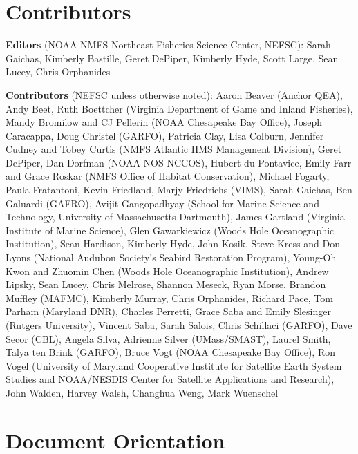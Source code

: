 \documentclass[
  10pt,
]{article}
\begin{document}
\hypertarget{contributors}{%
\section{Contributors}\label{contributors}}

\textbf{Editors} (NOAA NMFS Northeast Fisheries Science Center, NEFSC):
Sarah Gaichas, Kimberly Bastille, Geret DePiper, Kimberly Hyde, Scott
Large, Sean Lucey, Chris Orphanides

\textbf{Contributors} (NEFSC unless otherwise noted): Aaron Beaver
(Anchor QEA), Andy Beet, Ruth Boettcher (Virginia Department of Game and
Inland Fisheries), Mandy Bromilow and CJ Pellerin (NOAA Chesapeake Bay
Office), Joseph Caracappa, Doug Christel (GARFO), Patricia Clay, Lisa
Colburn, Jennifer Cudney and Tobey Curtis (NMFS Atlantic HMS Management
Division), Geret DePiper, Dan Dorfman (NOAA-NOS-NCCOS), Hubert du
Pontavice, Emily Farr and Grace Roskar (NMFS Office of Habitat
Conservation), Michael Fogarty, Paula Fratantoni, Kevin Friedland, Marjy
Friedrichs (VIMS), Sarah Gaichas, Ben Galuardi (GAFRO), Avijit
Gangopadhyay (School for Marine Science and Technology, University of
Massachusetts Dartmouth), James Gartland (Virginia Institute of Marine
Science), Glen Gawarkiewicz (Woods Hole Oceanographic Institution), Sean
Hardison, Kimberly Hyde, John Kosik, Steve Kress and Don Lyons (National
Audubon Society's Seabird Restoration Program), Young-Oh Kwon and
Zhuomin Chen (Woods Hole Oceanographic Institution), Andrew Lipsky, Sean
Lucey, Chris Melrose, Shannon Meseck, Ryan Morse, Brandon Muffley
(MAFMC), Kimberly Murray, Chris Orphanides, Richard Pace, Tom Parham
(Maryland DNR), Charles Perretti, Grace Saba and Emily Slesinger
(Rutgers University), Vincent Saba, Sarah Salois, Chris Schillaci
(GARFO), Dave Secor (CBL), Angela Silva, Adrienne Silver (UMass/SMAST),
Laurel Smith, Talya ten Brink (GARFO), Bruce Vogt (NOAA Chesapeake Bay
Office), Ron Vogel (University of Maryland Cooperative Institute for
Satellite Earth System Studies and NOAA/NESDIS Center for Satellite
Applications and Research), John Walden, Harvey Walsh, Changhua Weng,
Mark Wuenschel

\newpage

\hypertarget{document-orientation}{%
\section{Document Orientation}\label{document-orientation}}
\end{document}
